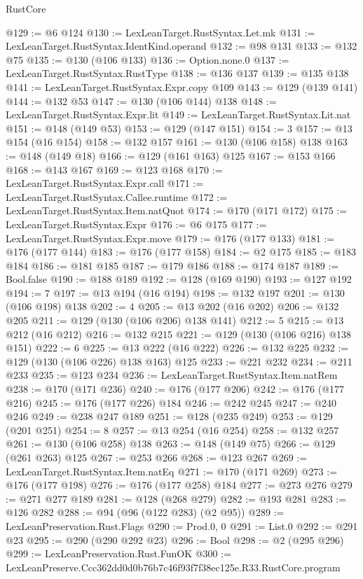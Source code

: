 \begin{lexlean}{RustCore}
\begin{coremodule}
@129 := @6 @124
@130 := LexLeanTarget.RustSyntax.Let.mk
@131 := LexLeanTarget.RustSyntax.IdentKind.operand
@132 := @98 @131
@133 := @132 @75
@135 := @130 (@106 @133)
@136 := Option.none.{0}
@137 := LexLeanTarget.RustSyntax.RustType
@138 := @136 @137
@139 := @135 @138
@141 := LexLeanTarget.RustSyntax.Expr.copy @109
@143 := @129 (@139 @141)
@144 := @132 @53
@147 := @130 (@106 @144) @138
@148 := LexLeanTarget.RustSyntax.Expr.lit
@149 := LexLeanTarget.RustSyntax.Lit.nat
@151 := @148 (@149 @53)
@153 := @129 (@147 @151)
@154 := 3
@157 := @13 @154 (@16 @154)
@158 := @132 @157
@161 := @130 (@106 @158) @138
@163 := @148 (@149 @18)
@166 := @129 (@161 @163) @125
@167 := @153 @166
@168 := @143 @167
@169 := @123 @168
@170 := LexLeanTarget.RustSyntax.Expr.call
@171 := LexLeanTarget.RustSyntax.Callee.runtime
@172 := LexLeanTarget.RustSyntax.Item.natQuot
@174 := @170 (@171 @172)
@175 := LexLeanTarget.RustSyntax.Expr
@176 := @6 @175
@177 := LexLeanTarget.RustSyntax.Expr.move
@179 := @176 (@177 @133)
@181 := @176 (@177 @144)
@183 := @176 (@177 @158)
@184 := @2 @175
@185 := @183 @184
@186 := @181 @185
@187 := @179 @186
@188 := @174 @187
@189 := Bool.false
@190 := @188 @189
@192 := @128 (@169 @190)
@193 := @127 @192
@194 := 7
@197 := @13 @194 (@16 @194)
@198 := @132 @197
@201 := @130 (@106 @198) @138
@202 := 4
@205 := @13 @202 (@16 @202)
@206 := @132 @205
@211 := @129 (@130 (@106 @206) @138 @141)
@212 := 5
@215 := @13 @212 (@16 @212)
@216 := @132 @215
@221 := @129 (@130 (@106 @216) @138 @151)
@222 := 6
@225 := @13 @222 (@16 @222)
@226 := @132 @225
@232 := @129 (@130 (@106 @226) @138 @163) @125
@233 := @221 @232
@234 := @211 @233
@235 := @123 @234
@236 := LexLeanTarget.RustSyntax.Item.natRem
@238 := @170 (@171 @236)
@240 := @176 (@177 @206)
@242 := @176 (@177 @216)
@245 := @176 (@177 @226) @184
@246 := @242 @245
@247 := @240 @246
@249 := @238 @247 @189
@251 := @128 (@235 @249)
@253 := @129 (@201 @251)
@254 := 8
@257 := @13 @254 (@16 @254)
@258 := @132 @257
@261 := @130 (@106 @258) @138
@263 := @148 (@149 @75)
@266 := @129 (@261 @263) @125
@267 := @253 @266
@268 := @123 @267
@269 := LexLeanTarget.RustSyntax.Item.natEq
@271 := @170 (@171 @269)
@273 := @176 (@177 @198)
@276 := @176 (@177 @258) @184
@277 := @273 @276
@279 := @271 @277 @189
@281 := @128 (@268 @279)
@282 := @193 @281
@283 := @126 @282
@288 := @94 (@96 (@122 @283) (@2 @95))
@289 := LexLeanPreservation.Rust.Flags
@290 := Prod.{0, 0}
@291 := List.{0}
@292 := @291 @23
@295 := @290 (@290 @292 @23)
@296 := Bool
@298 := @2 (@295 @296)
@299 := LexLeanPreservation.Rust.FunOK
@300 := LexLeanPreserve.Ccc362dd0d0b76b7c46f93f7f38ec125e.R33.RustCore.program

\end{coremodule}
\end{lexlean}
